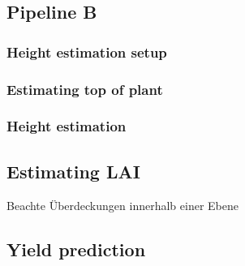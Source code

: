 \subsection{Pipeline B}

\subsubsection{Height estimation setup}
\subsubsection{Estimating top of plant}
\subsubsection{Height estimation}
\subsection{Estimating LAI}
\label{section:EstLAI}
Beachte Überdeckungen innerhalb einer Ebene
\subsection{Yield prediction}

